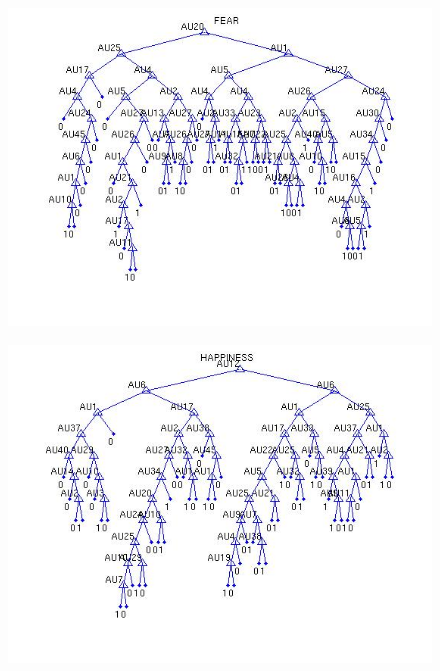 \documentclass[11pt]{amsart}
\begin{document}
\begin{figure}[!h]
\begin{center}
\includegraphics[scale=0.6]{fear.jpg}
\end{center}
\end{figure}

\begin{figure}[!h]
\includegraphics[scale=0.6]{happiness.jpg}
\end{figure}
\end{document}
